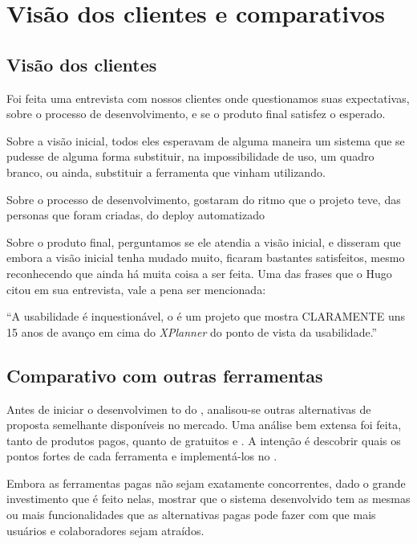 \section{Visão dos clientes e comparativos}

\subsection{Visão dos clientes}

Foi feita uma entrevista com nossos clientes onde questionamos suas expectativas, sobre o processo de desenvolvimento, e se o produto final satisfez o esperado.

Sobre a visão inicial, todos eles esperavam de alguma maneira um sistema que se pudesse de alguma forma substituir, na impossibilidade de uso, um quadro branco, ou ainda, substituir a ferramenta que vinham utilizando. 

Sobre o processo de desenvolvimento, gostaram do ritmo que o projeto teve, das personas que foram criadas, do deploy automatizado

Sobre o produto final, perguntamos se ele atendia a visão inicial, e disseram que embora a visão inicial tenha mudado muito, ficaram bastantes satisfeitos, mesmo reconhecendo que ainda há muita coisa a ser feita. Uma das frases que o Hugo citou em sua entrevista, vale a pena ser mencionada:

``A usabilidade é inquestionável, o \calopsita{} é um projeto que mostra CLARAMENTE uns 15 anos de avanço em cima do \textit{XPlanner} do ponto de vista da usabilidade.''

\subsection{Comparativo com outras ferramentas}

Antes de iniciar o desenvolvimen	to do \calopsita{}, analisou-se outras alternativas de proposta semelhante disponíveis no mercado. Uma análise bem extensa foi feita, tanto de produtos pagos, quanto de gratuitos e \opensource{}. A intenção é descobrir quais os pontos fortes de cada ferramenta e implementá-los no \calopsita{}. 

Embora as ferramentas pagas não sejam exatamente concorrentes, dado o grande investimento que é feito nelas, mostrar que o sistema desenvolvido tem as mesmas ou mais funcionalidades que as alternativas pagas pode fazer com que mais usuários e colaboradores sejam atraídos.

